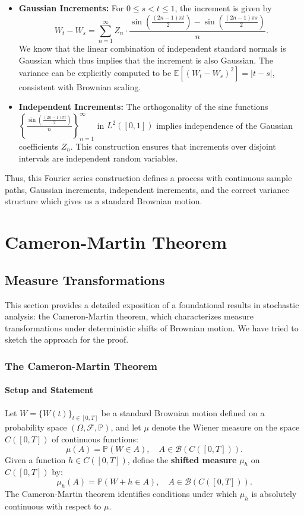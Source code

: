 \documentclass[12pt]{report}
\begin{document}
\begin{itemize}
    \item \textbf{Gaussian Increments:}  
    For \( 0 \leq s < t \leq 1 \), the increment is given by
    \[
    W_t - W_s = \sum_{n=1}^\infty Z_n \cdot \frac{\sin\left( \frac{(2n-1)\pi t}{2} \right) - \sin\left( \frac{(2n-1)\pi s}{2} \right)}{n}.
    \]
    We know that the linear combination of independent standard normals is Gaussian which thus implies that the increment is also Gaussian. The variance can be explicitly computed to be \( \mathbb{E}[(W_t - W_s)^2] = |t - s| \), consistent with Brownian scaling.

    \item \textbf{Independent Increments:}  
    The orthogonality of the sine functions \(\left\{\frac{\sin\left( \frac{(2n-1)\pi t}{2} \right)}{n}\right\}_{n=1}^\infty\) in \(L^2([0,1])\) implies independence of the Gaussian coefficients \(Z_n\). This construction ensures that increments over disjoint intervals are independent random variables.
\end{itemize}

Thus, this Fourier series construction defines a process with continuous sample paths, Gaussian increments, independent increments, and the correct variance structure which gives us a standard Brownian motion.

\chapter{Cameron-Martin Theorem}
\section{Measure Transformations}
This section provides a detailed exposition of a foundational results in stochastic analysis: the Cameron-Martin theorem, which characterizes measure transformations under deterministic shifts of Brownian motion.
We have tried to sketch the approach for the proof.

\subsection{The Cameron-Martin Theorem}  
\subsubsection{Setup and Statement}  
Let \( W = \{W(t)\}_{t \in [0, T]} \) be a standard Brownian motion defined on a probability space \((\Omega, \mathcal{F}, \mathbb{P})\), and let \(\mu\) denote the Wiener measure on the space \(C([0, T])\) of continuous functions:  
\[
\mu(A) = \mathbb{P}(W \in A), \quad A \in \mathcal{B}(C([0, T])).
\]  
Given a function \( h \in C([0, T]) \), define the \textbf{shifted measure} \(\mu_h\) on \(C([0, T])\) by:  
\[
\mu_h(A) = \mathbb{P}(W + h \in A), \quad A \in \mathcal{B}(C([0, T])).
\]  
The Cameron-Martin theorem identifies conditions under which \(\mu_h\) is absolutely continuous with respect to \(\mu\).
\end{document}
